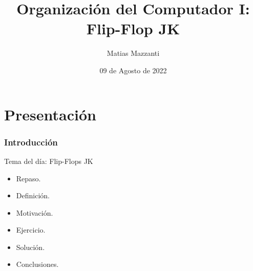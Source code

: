 \documentclass[10pt]{beamer}
\title[Flip-Flop JK]{Organizaci\'on del Computador I: Flip-Flop JK}
\author[Matias Mazzanti]{Matias Mazzanti}
\institute{DC-UBA}
\date{09 de Agosto de 2022}
\begin{document}
\begin{frame}

\maketitle

\end{frame}


\section{Presentaci\'on}
\begin{frame}
\frametitle{Introducción}
\begin{mdframed}[backgroundcolor=frenchblue!20]
  Tema del día: Flip-Flops JK
\end{mdframed}

\begin{itemize}
  \item Repaso.
  \item Definición.
  \item Motivación.
  \item Ejercicio.
  \item Solución.
  \item Conclusiones.
\end{itemize}

\end{frame}
\end{document}
